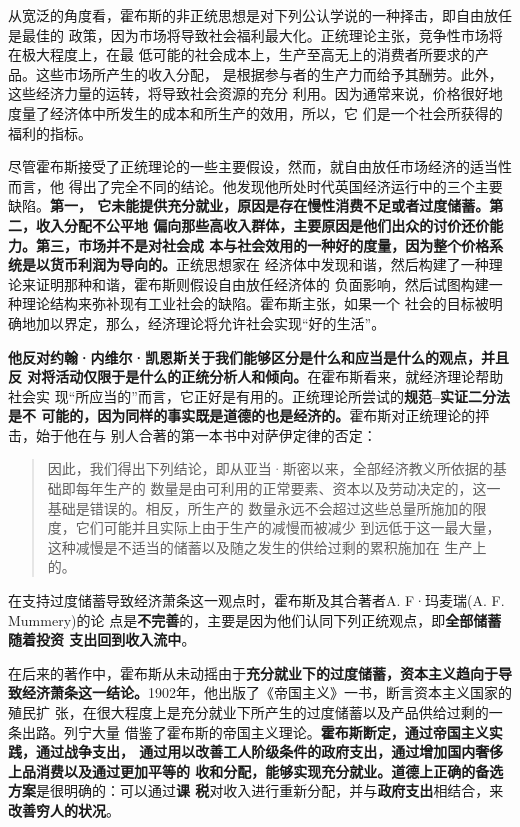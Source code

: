 从宽泛的角度看，霍布斯的非正统思想是对下列公认学说的一种择击，即自由放任是最佳的
政策，因为市场将导致社会福利最大化。正统理论主张，竞争性市场将在极大程度上，在最
低可能的社会成本上，生产至高无上的消费者所要求的产品。这些市场所产生的收入分配，
是根据参与者的生产力而给予其酬劳。此外，这些经济力量的运转，将导致社会资源的充分
利用。因为通常来说，价格很好地度量了经济体中所发生的成本和所生产的效用，所以，它
们是一个社会所获得的福利的指标。

尽管霍布斯接受了正统理论的一些主要假设，然而，就自由放任市场经济的适当性而言，他
得出了完全不同的结论。他发现他所处时代英国经济运行中的三个主要缺陷。\textbf{第一，
  它未能提供充分就业，原因是存在慢性消费不足或者过度储蓄。第二，收入分配不公平地
  偏向那些高收入群体，主要原因是他们出众的讨价还价能力。第三，市场并不是对社会成
  本与社会效用的一种好的度量，因为整个价格系统是以货币利润为导向的。}正统思想家在
经济体中发现和谐，然后构建了一种理论来证明那种和谐，霍布斯则假设自由放任经济体的
负面影响，然后试图构建一种理论结构来弥补现有工业社会的缺陷。霍布斯主张，如果一个
社会的目标被明确地加以界定，那么，经济理论将允许社会实现“好的生活”。

\textbf{他反对约翰·内维尔·凯恩斯关于我们能够区分是什么和应当是什么的观点，并且反
  对将活动仅限于是什么的正统分析人和倾向。}在霍布斯看来，就经济理论帮助社会实
现“所应当的”而言，它正好是有用的。正统理论所尝试的\textbf{规范--实证二分法是不
  可能的，因为同样的事实既是道德的也是经济的。}霍布斯对正统理论的抨击，始于他在与
别人合著的第一本书中对萨伊定律的否定：

\begin{quotation}
  因此，我们得出下列结论，即从亚当·斯密以来，全部经济教义所依据的基础即每年生产的
  数量是由可利用的正常要素、资本以及劳动决定的，这一基础是错误的。相反，所生产的
  数量永远不会超过这些总量所施加的限度，它们可能并且实际上由于生产的减慢而被减少
  到远低于这一最大量，这种减慢是不适当的储蓄以及随之发生的供给过剩的累积施加在
  生产上的。
\end{quotation}

在支持过度储蓄导致经济萧条这一观点时，霍布斯及其合著者A. F·玛麦瑞(A. F. Mummery)的论
点是\textbf{不完善}的，主要是因为他们认同下列正统观点，即\textbf{全部储蓄随着投资
  支出回到收入流中}。

在后来的著作中，霍布斯从未动摇由于\textbf{充分就业下的过度储蓄，资本主义趋向于导
  致经济萧条这一结论。}1902年，他出版了《帝国主义》一书，断言资本主义国家的殖民扩
张，在很大程度上是充分就业下所产生的过度储蓄以及产品供给过剩的一条出路。列宁大量
借鉴了霍布斯的帝国主义理论。\textbf{霍布斯断定，通过帝国主义实践，通过战争支出，
  通过用以改善工人阶级条件的政府支出，通过增加国内奢侈上品消费以及通过更加平等的
  收和分配，能够实现充分就业。道德上正确的备选方案}是很明确的：可以通过\textbf{课
  税}对收入进行重新分配，并与\textbf{政府支出}相结合，来\textbf{改善穷人的状况}。

